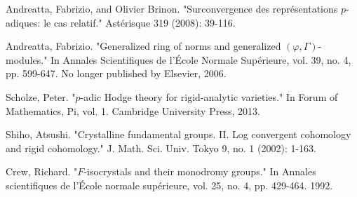 \documentclass[12pt]{amsart}
\theoremstyle{definition}
\numberwithin{equation}{section}
\begin{document}
\begin{thebibliography}{10}
 Andreatta, Fabrizio, and Olivier Brinon. "Surconvergence des repr\'esentations $p$-adiques: le cas relatif." Ast\'erisque 319 (2008): 39-116.

 Andreatta, Fabrizio. "Generalized ring of norms and generalized $(\varphi, \Gamma)$-modules." In Annales Scientifiques de l'\'Ecole Normale Sup\'erieure, vol. 39, no. 4, pp. 599-647. No longer published by Elsevier, 2006.

 Scholze, Peter. "$ p $-adic Hodge theory for rigid-analytic varieties." In Forum of Mathematics, Pi, vol. 1. Cambridge University Press, 2013.

 Shiho, Atsushi. "Crystalline fundamental groups. II. Log convergent cohomology and rigid cohomology." J. Math. Sci. Univ. Tokyo 9, no. 1 (2002): 1-163.

 Crew, Richard. "$ F $-isocrystals and their monodromy groups." In Annales scientifiques de l'\'Ecole normale sup\'erieure, vol. 25, no. 4, pp. 429-464. 1992.

\end{thebibliography}



%
\end{document}
